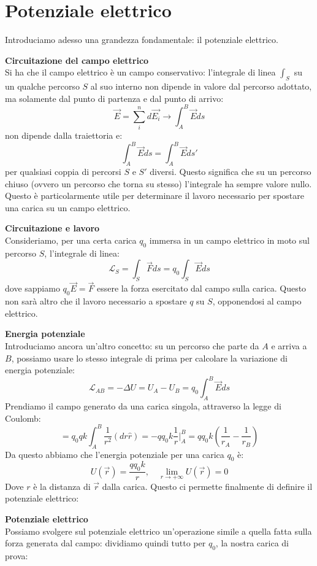 \documentclass[a4paper,12pt]{article}
\begin{document}
\section{Potenziale elettrico}
Introduciamo adesso una grandezza fondamentale: il potenziale elettrico. 
\par\smallskip
\textbf{Circuitazione del campo elettrico} \\
Si ha che il campo elettrico è un campo conservativo: l'integrale di linea $\int_S$ su un qualche percorso $S$ al suo interno non dipende in valore dal percorso adottato, ma solamente dal punto di partenza e dal punto di arrivo:
$$ \vec{E} = \sum_i^n d\vec{E_i} \rightarrow \int_A^B \vec{E} ds $$
non dipende dalla traiettoria e:
$$ \int_A^B \vec{E} ds = \int_A^B \vec{E} ds' $$
per qualsiasi coppia di percorsi $S$ e $S'$ diversi.
Questo significa che su un percorso chiuso (ovvero un percorso che torna su stesso) l'integrale ha sempre valore nullo. Questo è particolarmente utile per determinare il lavoro necessario per spostare una carica su un campo
elettrico.
\par\smallskip
\textbf{Circuitazione e lavoro} \\
Consideriamo, per una certa carica $q_0$ immersa in un campo elettrico in moto sul percorso $S$, l'integrale di linea:
$$ \mathcal{L}_S = \int_S \vec{F}ds = q_0\int_S \vec{E}ds$$
dove sappiamo $q_0\vec{E} = \vec{F}$ essere la forza esercitato dal campo sulla carica. Questo non sarà altro che il lavoro necessario a spostare $q$ su $S$, opponendosi al campo elettrico.
\par\smallskip
\textbf{Energia potenziale}\\
Introduciamo ancora un'altro concetto: su un percorso che parte da $A$ e arriva a $B$, possiamo usare lo stesso integrale di prima per calcolare la variazione di energia potenziale:
$$ \mathcal{L}_{AB} = -\Delta U = U_A - U_B = q_0\int_A^B \vec{E} ds $$
Prendiamo il campo generato da una carica singola, attraverso la legge di Coulomb:
$$ = q_0qk\int_A^B \frac{1}{r^2}(dr \hat{r}) = -qq_0k \frac{1}{r}\Big|^B_A = qq_0k\left(\frac{1}{r_A} - \frac{1}{r_B}\right) $$
Da questo abbiamo che l'energia potenziale per una carica $q_0$ è:
$$ U(\vec{r}) = \frac{qq_0k}{r}, \quad \lim_{r\rightarrow +\infty} U(\vec{r}) = 0$$
Dove $r$ è la distanza di $\vec{r}$ dalla carica.
Questo ci permette finalmente di definire il potenziale elettrico:
\par\smallskip
\textbf{Potenziale elettrico} \\
Possiamo svolgere sul potenziale elettrico un'operazione simile a quella fatta sulla forza generata dal campo: dividiamo quindi tutto per $q_0$, la nostra carica di prova:
\end{document}
